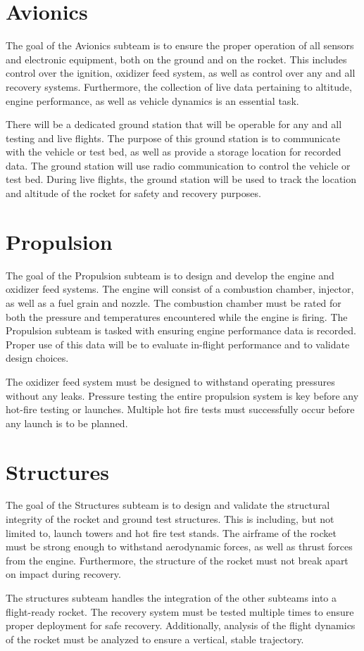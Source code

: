 \documentclass[12pt,article]{memoir}
\begin{document}
\section{Avionics}
The goal of the Avionics subteam is to ensure the proper operation of all sensors and electronic equipment, both on the ground and on the rocket. This includes control over the ignition, oxidizer feed system, as well as control over any and all recovery systems. Furthermore, the collection of live data pertaining to altitude, engine performance, as well as vehicle dynamics is an essential task.\par
There will be a dedicated ground station that will be operable for any and all testing and live flights. The purpose of this ground station is to communicate with the vehicle or test bed, as well as provide a storage location for recorded data. The ground station will use radio communication to 
control the vehicle or test bed. During live flights, the ground station will be used to track the location and altitude of the rocket for safety and recovery purposes.

\section{Propulsion}
The goal of the Propulsion subteam is to design and develop the engine and oxidizer feed systems. The engine will consist of a combustion chamber, injector, as well as a fuel grain and nozzle. The combustion chamber must be rated for both the pressure and temperatures encountered while the engine is firing. The Propulsion subteam is tasked with ensuring engine performance data is recorded. Proper use of this data will be to evaluate in-flight performance and to validate design choices.\par
The oxidizer feed system must be designed to withstand operating pressures without any leaks. Pressure testing the entire propulsion system is key before any hot-fire testing or launches. Multiple hot fire tests must successfully occur before any launch is to be planned.

\section{Structures}
The goal of the Structures subteam is to design and validate the structural integrity of the rocket and ground test structures. This is including, but not limited to, launch towers and hot fire test stands. The airframe of the rocket must be strong enough to withstand aerodynamic forces, as well as thrust forces from the engine. Furthermore, the structure of the rocket must not break apart on impact during recovery.\par
The structures subteam handles the integration of the other subteams into a flight-ready rocket. The recovery system must be tested multiple times to ensure proper deployment for safe recovery. Additionally, analysis of the flight dynamics of the rocket must be analyzed to ensure a vertical, stable trajectory.

\newpage

\end{document}
